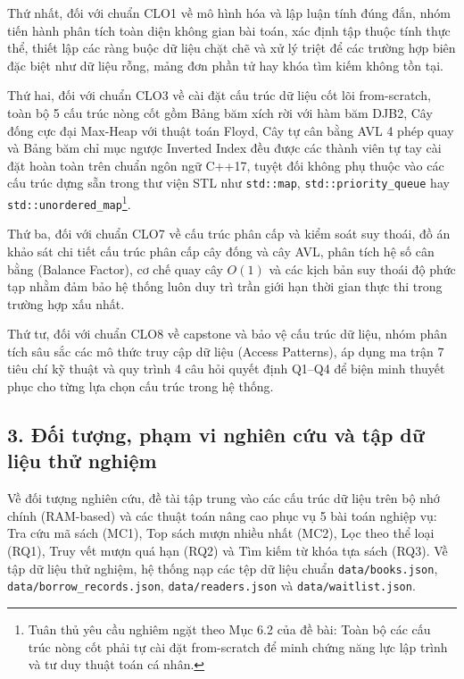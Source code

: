 \documentclass[14pt,a4paper]{extarticle}
\begin{document}
Thứ nhất, đối với chuẩn CLO1 về mô hình hóa và lập luận tính đúng đắn, nhóm tiến hành phân tích toàn diện không gian bài toán, xác định tập thuộc tính thực thể, thiết lập các ràng buộc dữ liệu chặt chẽ và xử lý triệt để các trường hợp biên đặc biệt như dữ liệu rỗng, mảng đơn phần tử hay khóa tìm kiếm không tồn tại.

Thứ hai, đối với chuẩn CLO3 về cài đặt cấu trúc dữ liệu cốt lõi from-scratch, toàn bộ 5 cấu trúc nòng cốt gồm Bảng băm xích rời với hàm băm DJB2, Cây đống cực đại Max-Heap với thuật toán Floyd, Cây tự cân bằng AVL 4 phép quay và Bảng băm chỉ mục ngược Inverted Index đều được các thành viên tự tay cài đặt hoàn toàn trên chuẩn ngôn ngữ C++17, tuyệt đối không phụ thuộc vào các cấu trúc dựng sẵn trong thư viện STL như \texttt{std::map}, \texttt{std::priority\_queue} hay \texttt{std::unordered\_map}\footnote{Tuân thủ yêu cầu nghiêm ngặt theo Mục 6.2 của đề bài: Toàn bộ các cấu trúc nòng cốt phải tự cài đặt from-scratch để minh chứng năng lực lập trình và tư duy thuật toán cá nhân.}.

Thứ ba, đối với chuẩn CLO7 về cấu trúc phân cấp và kiểm soát suy thoái, đồ án khảo sát chi tiết cấu trúc phân cấp cây đống và cây AVL, phân tích hệ số cân bằng (Balance Factor), cơ chế quay cây $O(1)$ và các kịch bản suy thoái độ phức tạp nhằm đảm bảo hệ thống luôn duy trì trần giới hạn thời gian thực thi trong trường hợp xấu nhất.

Thứ tư, đối với chuẩn CLO8 về capstone và bảo vệ cấu trúc dữ liệu, nhóm phân tích sâu sắc các mô thức truy cập dữ liệu (Access Patterns), áp dụng ma trận 7 tiêu chí kỹ thuật và quy trình 4 câu hỏi quyết định Q1--Q4 để biện minh thuyết phục cho từng lựa chọn cấu trúc trong hệ thống.

\subsection*{3. Đối tượng, phạm vi nghiên cứu và tập dữ liệu thử nghiệm}

Về đối tượng nghiên cứu, đề tài tập trung vào các cấu trúc dữ liệu trên bộ nhớ chính (RAM-based) và các thuật toán nâng cao phục vụ 5 bài toán nghiệp vụ: Tra cứu mã sách (MC1), Top sách mượn nhiều nhất (MC2), Lọc theo thể loại (RQ1), Truy vết mượn quá hạn (RQ2) và Tìm kiếm từ khóa tựa sách (RQ3). Về tập dữ liệu thử nghiệm, hệ thống nạp các tệp dữ liệu chuẩn \texttt{data/books.json}, \texttt{data/borrow\_records.json}, \texttt{data/readers.json} và \texttt{data/waitlist.json}.
\end{document}
